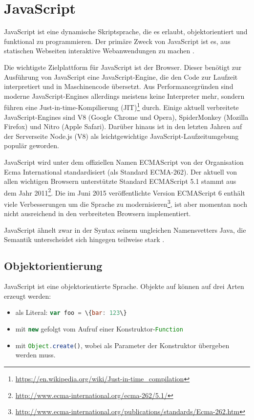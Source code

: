 \documentclass[a4paper, 12pt, hidelinks, listof=totoc, listoftables=totoc, bibliography=totoc]{scrreprt}
\newcommand{\code}[1]{\lstinline[language=Scala, style=inline]|#1|}
\newcommand{\js}[1]{\lstinline[language=JavaScript, style=inline]|#1|}
\begin{document}
\section{JavaScript}

JavaScript ist eine dynamische Skriptsprache, die es erlaubt, objektorientiert und funktional zu programmieren. Der primäre Zweck von JavaScript ist es, aus statischen Webseiten interaktive Webanwendungen zu machen \cite[S. 361]{flanagan2011.JDG}.

Die wichtigste Zielplattform für JavaScript ist der Browser. Dieser benötigt zur Ausführung von JavaScript eine JavaScript-Engine, die den Code zur Laufzeit interpretiert und in Maschinencode übersetzt. Aus Performancegründen sind moderne JavaScript-Engines allerdings meistens keine Interpreter mehr, sondern führen eine Just-in-time-Kompilierung (JIT)\footnote{\url{https://en.wikipedia.org/wiki/Just-in-time_compilation}} durch. Einige aktuell verbreitete JavaScript-Engines sind V8 (Google Chrome und Opera), SpiderMonkey (Mozilla Firefox) und Nitro (Apple Safari). Darüber hinaus ist in den letzten Jahren auf der Serverseite Node.js (V8) als leichtgewichtige JavaScript-Laufzeitumgebung populär geworden.

JavaScript wird unter dem offiziellen Namen ECMAScript von der Organisation Ecma International standardisiert (als Standard ECMA-262). Der aktuell von allen wichtigen Browsern unterstützte Standard ECMAScript 5.1 stammt aus dem Jahr 2011\footnote{\url{http://www.ecma-international.org/ecma-262/5.1/}}. Die im Juni 2015 veröffentlichte Version ECMAScript 6 enthält viele Verbesserungen um die Sprache zu modernisieren\footnote{\url{http://www.ecma-international.org/publications/standards/Ecma-262.htm}}, ist aber momentan noch nicht ausreichend in den verbreiteten Browsern implementiert.

JavaScript ähnelt zwar in der Syntax seinem ungleichen Namensvetters Java, die Semantik unterscheidet sich hingegen teilweise stark \cite{eich1996.JSL}.


\subsection{Objektorientierung}\label{subsec:js-oo}

JavaScript ist eine objektorientierte Sprache. Objekte auf können auf drei Arten erzeugt werden:

\begin{itemize}
  \item als Literal: \js{var foo = \{bar: 123\}}
  \item mit \js{new} gefolgt vom Aufruf einer Konstruktor-\code{Function}
  \item mit \js{Object.create()}, wobei als Parameter der Konstruktor übergeben werden muss.
\end{itemize}
\end{document}
